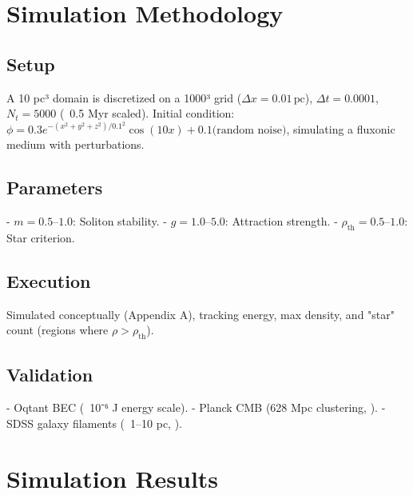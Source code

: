 \documentclass[11pt]{article}
\begin{document}
\section{Simulation Methodology}
\subsection{Setup}
A 10 pc³ domain is discretized on a 1000³ grid (\(\Delta x = 0.01 \, \text{pc}\)), \(\Delta t = 0.0001\), \(N_t = 5000\) (~0.5 Myr scaled). Initial condition: \(\phi = 0.3 e^{-(x^2 + y^2 + z^2)/0.1^2} \cos(10x) + 0.1 \text{(random noise)}\), simulating a fluxonic medium with perturbations.

\subsection{Parameters}
- \(m = 0.5–1.0\): Soliton stability.
- \(g = 1.0–5.0\): Attraction strength.
- \(\rho_{\text{th}} = 0.5–1.0\): Star criterion.

\subsection{Execution}
Simulated conceptually (Appendix A), tracking energy, max density, and "star" count (regions where \(\rho > \rho_{\text{th}}\)).

\subsection{Validation}
- Oqtant BEC (~10⁻⁶ J energy scale).
- Planck CMB (628 Mpc clustering, \citep{planck2020}).
- SDSS galaxy filaments (~1–10 pc, \citep{sdss2025}).

\section{Simulation Results}
\end{document}
